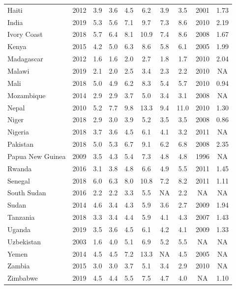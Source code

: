 \documentclass[12pt,english]{article}
\begin{document}
\begin{table}[b]
{\begin{tabular}[t]{lccccccccc}
  Haiti & 2012 & 3.9 & 3.6 & 4.5 & 6.2 & 3.9 & 3.5 & 2001 & 1.73\\
  India & 2019 & 5.3 & 5.6 & 7.1 & 9.7 & 7.3 & 8.6 & 2010 & 2.19\\
  Ivory Coast & 2018 & 5.7 & 6.4 & 8.1 & 10.9 & 7.4 & 8.6 & 2008 & 1.67\\
  Kenya & 2015 & 4.2 & 5.0 & 6.3 & 8.6 & 5.8 & 6.1 & 2005 & 1.99\\
  Madagascar & 2012 & 1.6 & 1.6 & 2.0 & 2.7 & 1.8 & 1.7 & 2010 & 2.04\\
  Malawi & 2019 & 2.1 & 2.0 & 2.5 & 3.4 & 2.3 & 2.2 & 2010 & NA\\
  Mali & 2018 & 5.0 & 4.9 & 6.2 & 8.3 & 5.4 & 5.7 & 2010 & 0.94\\
  Mozambique & 2014 & 2.9 & 2.9 & 3.7 & 5.0 & 3.4 & 3.1 & 2008 & NA\\
  Nepal & 2010 & 5.2 & 7.7 & 9.8 & 13.3 & 9.4 & 11.0 & 2010 & 1.30\\
  Niger & 2018 & 2.9 & 3.0 & 3.9 & 5.2 & 3.5 & 3.5 & 2008 & 0.86\\
  Nigeria & 2018 & 3.7 & 3.6 & 4.5 & 6.1 & 4.1 & 3.2 & 2011 & NA\\
  Pakistan & 2018 & 5.0 & 5.3 & 6.7 & 9.1 & 6.2 & 6.8 & 2008 & 2.35\\
  Papua New Guinea & 2009 & 3.5 & 4.3 & 5.4 & 7.3 & 4.8 & 4.8 & 1996 & NA\\
  Rwanda & 2016 & 3.1 & 3.8 & 4.8 & 6.6 & 4.9 & 5.5 & 2011 & 1.45\\
  Senegal & 2018 & 6.0 & 6.3 & 8.0 & 10.8 & 7.2 & 8.2 & 2011 & 1.11\\
  South Sudan & 2016 & 2.2 & 2.2 & 3.3 & 5.5 & NA & 2.2 & NA & NA\\
  Sudan & 2014 & 4.6 & 3.4 & 4.3 & 5.9 & 3.6 & 2.7 & 2009 & 1.94\\
  Tanzania & 2018 & 3.3 & 3.4 & 4.4 & 5.9 & 4.1 & 4.3 & 2007 & 1.43\\
  Uganda & 2019 & 3.5 & 3.6 & 4.5 & 6.1 & 4.2 & 4.1 & 2009 & 1.33\\
  Uzbekistan & 2003 & 1.6 & 4.0 & 5.1 & 6.9 & 5.2 & 5.5 & NA & NA\\
  Yemen & 2014 & 4.5 & 4.5 & 7.2 & 13.3 & NA & 4.5 & 2005 & NA\\
  Zambia & 2015 & 3.0 & 3.0 & 3.7 & 5.1 & 3.4 & 2.9 & 2010 & NA\\
  Zimbabwe & 2019 & 4.5 & 4.4 & 5.5 & 7.5 & 4.7 & 4.0 & NA & 1.10\\
  \bottomrule
  \end{tabular}}
  \end{table}
\end{document}
